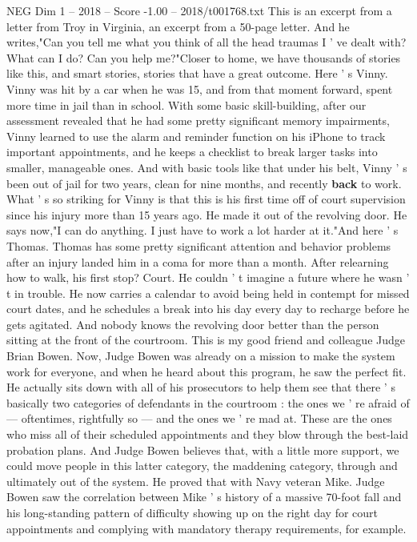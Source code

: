 \begin{textsample}{NEG Dim 1 – 2018 – Score -1.00 – 2018/t001768.txt}
This is an excerpt from a letter from Troy in Virginia, an excerpt from a 50-page letter.
And he writes,"Can you tell me what you think of all the head traumas I ' ve dealt with?
What can I do?
Can you help me?"Closer to home, we have thousands of stories like this, and smart stories, stories that have a great outcome.
Here ' s Vinny.
Vinny was hit by a car when he was 15, and from that moment forward, spent more time in jail than in school.
With some basic skill-building, after our assessment revealed that he had some pretty significant memory impairments, Vinny learned to use the alarm and reminder function on his iPhone to track important appointments, and he keeps a checklist to break larger tasks into smaller, manageable ones.
And with basic tools like that under his belt, Vinny ' s been out of jail for two years, clean for nine months, and recently \textbf{back} to work.
What ' s so striking for Vinny is that this is his first time off of court supervision since his injury more than 15 years ago.
He made it out of the revolving door.
He says now,"I can do anything.
I just have to work a lot harder at it."And here ' s Thomas.
Thomas has some pretty significant attention and behavior problems after an injury landed him in a coma for more than a month.
After relearning how to walk, his first stop?
Court.
He couldn ' t imagine a future where he wasn ' t in trouble.
He now carries a calendar to avoid being held in contempt for missed court dates, and he schedules a break into his day every day to recharge before he gets agitated.
And nobody knows the revolving door better than the person sitting at the front of the courtroom.
This is my good friend and colleague Judge Brian Bowen.
Now, Judge Bowen was already on a mission to make the system work for everyone, and when he heard about this program, he saw the perfect fit.
He actually sits down with all of his prosecutors to help them see that there ' s basically two categories of defendants in the courtroom : the ones we ' re afraid of — oftentimes, rightfully so — and the ones we ' re mad at.
These are the ones who miss all of their scheduled appointments and they blow through the best-laid probation plans.
And Judge Bowen believes that, with a little more support, we could move people in this latter category, the maddening category, through and ultimately out of the system.
He proved that with Navy veteran Mike.
Judge Bowen saw the correlation between Mike ' s history of a massive 70-foot fall and his long-standing pattern of difficulty showing up on the right day for court appointments and complying with mandatory therapy requirements, for example.

\end{textsample}
